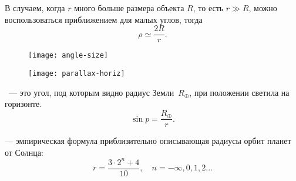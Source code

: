В случаем, когда $r$ много больше размера объекта $R$, то есть $r\gg R$, можно воспользоваться приближением для малых углов, тогда \begin{equation}
	\rho \simeq \frac{2 R}{r}.
\end{equation}

\begin{figure}[h!]
	\begin{minipage}[b]{0.49\tw}
		\centering
		\texttt{[image: angle-size]}
	\end{minipage}
	\hfill
	\begin{minipage}[b]{0.49\tw}
		\centering
		\texttt{[image: parallax-horiz]}
	\end{minipage}
\end{figure}

~--- это угол, под которым видно радиус Земли~$R_\oplus$, при положении светила на горизонте.
\begin{equation}
\sin p=\frac{R_\oplus}{r}.
\end{equation}

 --- эмпирическая формула приблизительно описывающая 
радиусы орбит планет от Солнца:
\begin{equation}r=\frac{3\cdot 2^n+4}{10}, \quad n=-\infty, 0, 1, 2...
\end{equation}

